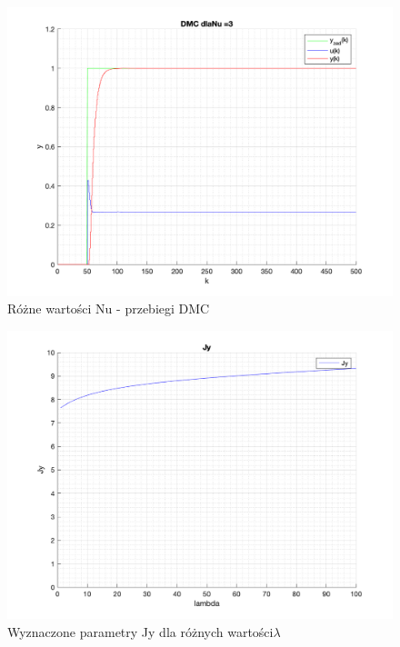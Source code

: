 \documentclass[a4paper, 11pt]{article}
\begin{document}
\begin{enumerate}
 \begin{figure} [H]
\centering
  \includegraphics[width=\linewidth]{./ModelsP4_Nu/P4_DMC_Nu_3_png.png} 
 \caption[Różne wartości Nu - przebiegi DMC]
{Różne wartości Nu - przebiegi DMC}
 \end{figure}
 \begin{figure} [h]
\centering
 \includegraphics[width=\linewidth]{./ModelsP4_J/Jylambda.png} 
 \caption[Wyznaczone parametry Jy dla różnych wartości \lambda]
{Wyznaczone parametry Jy dla różnych wartości\( \lambda\)}
 \end{figure}
 

\end{enumerate}
\end{document}
